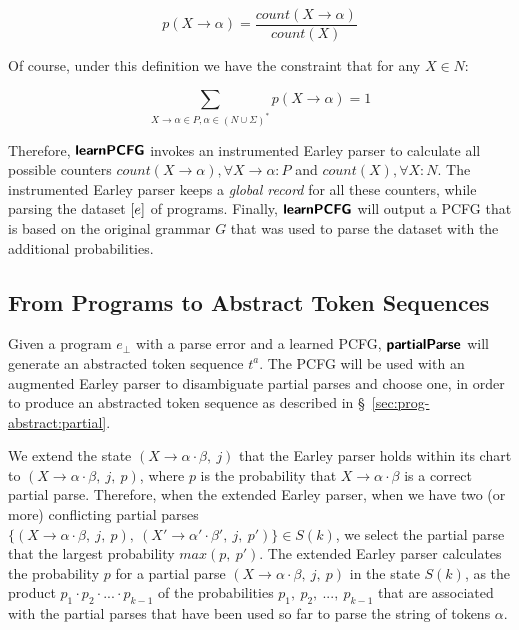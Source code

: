 \begin{equation*}
    p(X \rightarrow \alpha) = \frac{count(X \rightarrow \alpha)}{count(X)}
\end{equation*}

Of course, under this definition we have the constraint that for any $X \in N$:

\begin{equation*}
    \sum_{X \rightarrow \alpha \in P, \alpha \in (N \cup \Sigma)^{\ast}}{p(X \rightarrow \alpha)} = 1
\end{equation*}

Therefore, $\bm{\mathsf{learnPCFG}}$ invokes an instrumented Earley parser to calculate
all possible counters $count(X \rightarrow \alpha), \forall X \rightarrow
\alpha: P$ and $count(X), \forall X: N$. The instrumented Earley parser keeps a
\emph{global record} for all these counters, while parsing the dataset
$[e]$ of programs. Finally, $\bm{\mathsf{learnPCFG}}$ will output a PCFG that is
based on the original grammar $G$ that was used to parse the dataset with the
additional probabilities.


\subsection{From Programs to Abstract Token Sequences}

Given a program $e_{\bot}$ with a parse error and a learned PCFG, $\bm{\mathsf{partialParse}}$
will generate an abstracted token sequence $t^a$. The PCFG will be used with an
augmented Earley parser to disambiguate partial parses and choose one, in order
to produce an abstracted token sequence as described in
\S~\ref{sec:prog-abstract:partial}.

We extend the state $(X \rightarrow \alpha \cdot \beta,\ j)$ that the Earley
parser holds within its chart to $(X \rightarrow \alpha \cdot \beta,\ j,\ p)$,
where $p$ is the probability that $X \rightarrow \alpha \cdot \beta$ is a
correct partial parse. Therefore, when the extended Earley parser, when we have
two (or more) conflicting partial parses $\{(X \rightarrow \alpha \cdot \beta,\
j,\ p),\ (X' \rightarrow \alpha' \cdot \beta',\ j,\ p')\} \in S(k)$, we select
the partial parse that the largest probability $max(p,\ p')$. The extended
Earley parser calculates the probability $p$ for a partial parse $(X \rightarrow
\alpha \cdot \beta,\ j,\ p)$ in the state $S(k)$, as the product $p_1 \cdot p_2
\cdot ... \cdot p_{k-1}$ of the probabilities $p_1,\ p_2,\ ...,\ p_{k-1}$ that
are associated with the partial parses that have been used so far to parse the
string of tokens $\alpha$.




